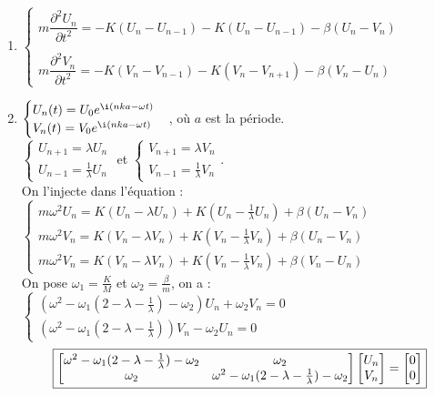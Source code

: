 \documentclass[12pt,a4paper]{article}
\begin{document}
	\begin{sol}
		$ $\\
		\begin{enumerate}
			\item $\begin{cases}
				m\dfrac{\partial^2 U_n}{\partial t^2} = -K(U_n-U_{n-1}) - K(U_n-U_{n-1}) - \beta(U_n-V_n)\\\\
				m\dfrac{\partial^2 V_n}{\partial t^2} = -K(V_n-V_{n-1}) - K(V_n-V_{n+1}) - \beta (V_n-U_n)
			\end{cases}$
			
			\item \begin{minipage}[t]{18.5cm}
				$\begin{cases}
					U_n(t) = U_0e^{\i (nka-\omega t)}\\
					V_n(t) = V_0e^{\i(nka-\omega t)}
				\end{cases}$, où $a$ est la période.\\
				$\begin{cases}
					U_{n+1} = \lambda U_n \\
					U_{n-1} = \frac{1}{\lambda} U_n
				\end{cases}$ et $\begin{cases}
					V_{n+1} = \lambda V_n\\
					V_{n-1} = \frac{1}{\lambda} V_n
				\end{cases}$.\\
				On l'injecte dans l'équation : $\begin{cases}
					m\omega^2 U_n = K(U_n-\lambda U_n)+K(U_n-\frac{1}{\lambda}U_n) + \beta(U_n-V_n)\\
					m\omega^2V_n = K(V_n-\lambda V_n) + K(V_n-\frac{1}{\lambda}V_n) + \beta(U_n-V_n)\\
					m\omega^2V_n = K(V_n-\lambda V_n) + K(V_n-\frac{1}{\lambda}V_n)+\beta(V_n-U_n)
				\end{cases}$\\
				On pose $\omega_1 = \frac{K}{M}$ et $\omega_2 = \frac{\beta}{m}$, on a : $\begin{cases}
					(\omega^2-\omega_1(2-\lambda-\frac{1}{\lambda}) -\omega_2)U_n + \omega_2 V_n = 0\\
					(\omega^2-\omega_1(2-\lambda-\frac1\lambda))V_n-\omega_2U_n = 0
				\end{cases}$\\
				
				\[\fbox{$\left[\begin{matrix}
						\omega^2-\omega_1(2-\lambda-\frac{1}{\lambda})-\omega_2 & \omega_2\\
						\omega_2 & \omega^2-\omega_1(2-\lambda-\frac1\lambda) - \omega_2
					\end{matrix}\right]\left[\begin{matrix}
						U_n \\ V_n
					\end{matrix}\right] = \left[\begin{matrix}
						0 \\ 0
					\end{matrix}\right]$}\]
				

\end{minipage}
\end{enumerate}
\end{sol}
\end{document}
